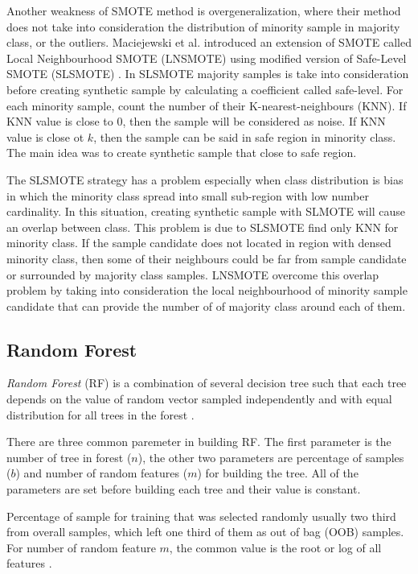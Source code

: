 \documentclass[conference,compsoc,a4paper,twocolumn,final]{IEEEtran}
\begin{document}
Another weakness of SMOTE method is overgeneralization, where their method does
not take into consideration the distribution of minority sample in majority
class, or the outliers.
Maciejewski et al. introduced an extension of SMOTE called Local Neighbourhood
SMOTE (LNSMOTE) \cite{maciejewski2011local}
using modified version of Safe-Level SMOTE (SLSMOTE)
\cite{bunkhumpornpat2009safe}.
In SLSMOTE majority samples is take into consideration before creating
synthetic sample by calculating a coefficient called safe-level.
For each minority sample, count the number of their K-nearest-neighbours (KNN).
If KNN value is close to 0, then the sample will be considered as noise.
If KNN value is close ot $k$, then the sample can be said in safe region in
minority class.
The main idea was to create synthetic sample that close to safe region.

The SLSMOTE strategy has a problem especially when class distribution is bias
in which the minority class spread into small sub-region with low number
cardinality.
In this situation, creating synthetic sample with SLMOTE will cause an overlap
between class.
This problem is due to SLSMOTE find only KNN for minority class.
If the sample candidate does not located in region with densed minority class,
then some of their neighbours could be far from sample candidate or surrounded
by majority class samples.
LNSMOTE overcome this overlap problem by taking into consideration the local
neighbourhood of minority sample candidate that can provide the number of of
majority class around each of them.

\subsection{Random Forest}
\label{subsection:rf}

\textit{Random Forest} (RF)
is a combination of several decision tree such that each tree depends on the
value of random vector sampled independently and with equal distribution for
all trees in the forest
\cite{breiman2001random}.

There are three common paremeter in building RF.
The first parameter is the number of tree in forest ($n$),
the other two parameters are percentage of samples ($b$) and number of random
features ($m$) for building the tree.
All of the parameters are set before building each tree and their value is
constant.

Percentage of sample for training that was selected randomly usually two third
from overall samples, which left one third of them as out of bag (OOB) samples.
For number of random feature $m$, the common value is the root or log of all
features \cite{breiman2001random}.
\end{document}
